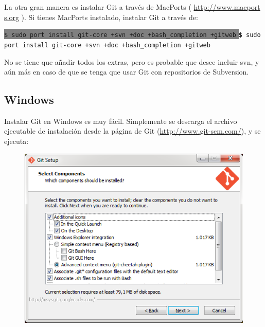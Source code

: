 \documentclass[12pt, spanish, oneside, onecolumn, a4paper]{report}
\newcommand{\shellcmd}[1]{ %
  \colorbox{Gray}{
    \indent\indent\texttt{\footnotesize\$ #1}
  }
  \colorbox{mygray}{
    \indent\indent\texttt{\textbf{\footnotesize\$} #1}
  }
}
\begin{document}
La otra gran manera es instalar Git a través de MacPorts ( \url{http://www.macport s.org} ). Si tienes MacPorts instalado, instalar Git a través de: 

\shellcmd{sudo port install git-core +svn +doc +bash\_completion +gitweb}

No se tiene que añadir todos los extras, pero es probable que desee incluir svn, y aún más en caso de que se tenga que usar Git con repositorios de Subversion. 

\subsection{Windows} 
\label{sec:installwindows}

Instalar Git en Windows es muy fácil. Simplemente se descarga el archivo ejecutable de instalación desde la página de Git (\url{http://www.git-scm.com/}), y se ejecuta:

\begin{figure}[hb] 
  \begin{center} 
    \includegraphics[width=.6\textwidth,keepaspectratio=true]{3.png} 
  \end{center} 
\end{figure} 
\clearpage
\end{document}
